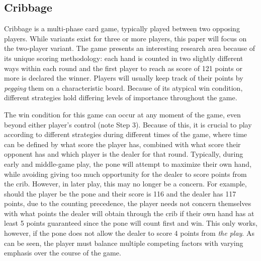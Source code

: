 

\subsection{Cribbage}

Cribbage is a multi-phase card game, typically played between two opposing
players.
%
While variants exist for three or more players, this paper will focus on the
two-player variant.
%
The game presents an interesting research area because of its unique scoring
methodology:
each hand is counted in two slightly different ways within each round and the
first player to reach as score of 121 points or more is declared the winner.
%
Players will usually keep track of their points by \textit{pegging} them on a 
characteristic board.
%
Because of its atypical win condition, different strategies hold differing
levels of importance throughout the game.




The win condition for this game can occur at any moment of the game,
even beyond either player's control (note Step 3).
%
Because of this,
it is crucial to play according to different strategies during
different times of the game,
where time can be defined by what score the player has,
combined with what score their opponent has
and which player is the dealer for that round.
%
Typically, during early and middle-game play,
the pone will attempt to maximize their own hand,
while avoiding giving too much opportunity for the dealer to score points from
the crib.
%
However, in later play, this may no longer be a concern.
%
For example, should the player be the pone and their score is 116
and the dealer has 117 points,
due to the counting precedence,
the player needs not concern themselves with what points the dealer will obtain
through the crib if their own hand has at least 5 points guaranteed
since the pone will count first and win.
%
This only works, however, if the pone does not allow the dealer to score 4
points from \textit{the play}.
%
As can be seen, the player must balance multiple competing factors with varying
emphasis over the course of the game.

%	

